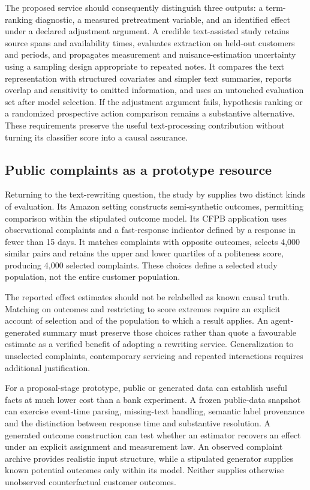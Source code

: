 The proposed service should consequently distinguish three outputs: a
term-ranking diagnostic, a measured pretreatment variable, and an identified
effect under a declared adjustment argument. A credible text-assisted study
retains source spans and availability times, evaluates extraction on held-out
customers and periods, and propagates measurement and nuisance-estimation
uncertainty using a sampling design appropriate to repeated notes. It compares
the text representation with structured covariates and simpler text summaries,
reports overlap and sensitivity to omitted information, and uses an untouched
evaluation set after model selection. If the adjustment argument fails,
hypothesis ranking or a randomized prospective action comparison remains a
substantive alternative. These requirements preserve the useful text-processing
contribution without turning its classifier score into a causal assurance.

\subsection{Public complaints as a prototype resource}

Returning to the text-rewriting question, the study by \citet{exec28_lm_pryzant} supplies two distinct kinds of evaluation. Its Amazon setting constructs semi-synthetic outcomes, permitting comparison within the stipulated outcome model. Its CFPB application uses observational complaints and a fast-response indicator defined by a response in fewer than 15 days. It matches complaints with opposite outcomes, selects 4,000 similar pairs and retains the upper and lower quartiles of a politeness score, producing 4,000 selected complaints. These choices define a selected study population, not the entire customer population.~\citep{exec28_lm_pryzant}

The reported effect estimates should not be relabelled as known causal truth. Matching on outcomes and restricting to score extremes require an explicit account of selection and of the population to which a result applies. An agent-generated summary must preserve those choices rather than quote a favourable estimate as a verified benefit of adopting a rewriting service. Generalization to unselected complaints, contemporary servicing and repeated interactions requires additional justification.

For a proposal-stage prototype, public or generated data can establish useful facts at much lower cost than a bank experiment. A frozen public-data snapshot can exercise event-time parsing, missing-text handling, semantic label provenance and the distinction between response time and substantive resolution. A generated outcome construction can test whether an estimator recovers an effect under an explicit assignment and measurement law. An observed complaint archive provides realistic input structure, while a stipulated generator supplies known potential outcomes only within its model. Neither supplies otherwise unobserved counterfactual customer outcomes.

